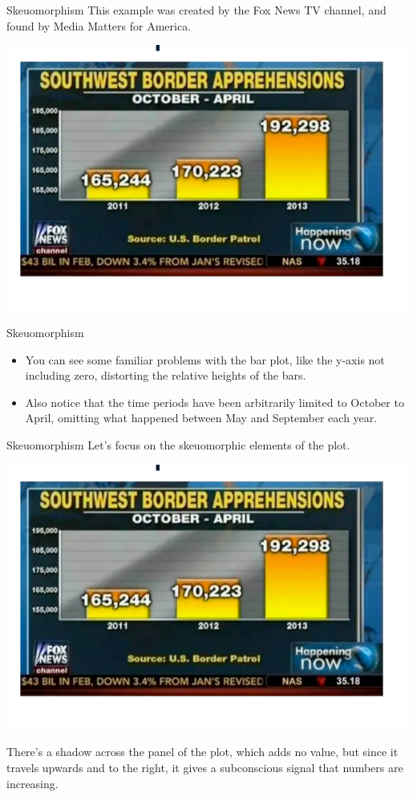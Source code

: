 \documentclass[
  ignorenonframetext,
]{beamer}
\begin{document}
\begin{frame}{Skeuomorphism}
\label{skeuomorphism}
This example was created by the Fox News TV channel, and found by Media
Matters for America.

\includegraphics{../images/im114.png}
\end{frame}

\begin{frame}{Skeuomorphism}
\label{skeuomorphism-1}
\begin{itemize}
\item
  You can see some familiar problems with the bar plot, like the y-axis
  not including zero, distorting the relative heights of the bars.
\item
  Also notice that the time periods have been arbitrarily limited to
  October to April, omitting what happened between May and September
  each year.
\end{itemize}
\end{frame}

\begin{frame}{Skeuomorphism}
\label{skeuomorphism-2}
Let's focus on the skeuomorphic elements of the plot.

\includegraphics{../images/im114.png}

There's a shadow across the panel of the plot, which adds no value, but
since it travels upwards and to the right, it gives a subconscious
signal that numbers are increasing.
\end{frame}
\end{document}

